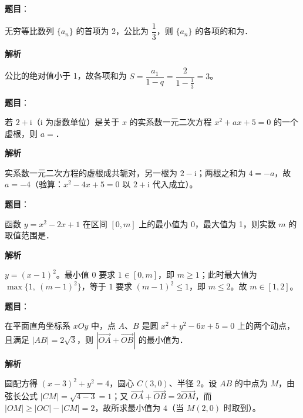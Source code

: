 \begin{answer}

\textbf{题目}：

无穷等比数列 \(\{a_{n}\}\) 的首项为 2，公比为 \(\dfrac{1}{3}\)，则 \(\{a_{n}\}\) 的各项的和为\gkblank{}．

\textbf{解析}

公比的绝对值小于 1，故各项和为 \(S=\dfrac{a_{1}}{1-q}=\dfrac{2}{1-\frac{1}{3}}=3\)。


\end{answer}
\begin{answer}

\textbf{题目}：

若 \(2+\mathrm{i}\)（\(\mathrm{i}\) 为虚数单位）是关于 \(x\) 的实系数一元二次方程 \(x^{2}+ax+5=0\) 的一个虚根，则 \(a=\)\gkblank{}．

\textbf{解析}

实系数一元二次方程的虚根成共轭对，另一根为 \(2-\mathrm{i}\)；两根之和为 \(4=-a\)，故 \(a=-4\)（验算：\(x^{2}-4x+5=0\) 以 \(2+\mathrm{i}\) 代入成立）。


\end{answer}
\begin{answer}

\textbf{题目}：

函数 \(y=x^{2}-2x+1\) 在区间 \([0,m]\) 上的最小值为 0，最大值为 1，则实数 \(m\) 的取值范围是\gkblank{}．

\textbf{解析}

\(y=(x-1)^{2}\)。最小值 \(0\) 要求 \(1\in[0,m]\)，即 \(m\geqslant 1\)；此时最大值为 \(\max\{1,\ (m-1)^{2}\}\)，等于 \(1\) 要求 \((m-1)^{2}\leqslant 1\)，即 \(m\leqslant 2\)。故 \(m\in[1,2]\)。


\end{answer}
\begin{answer}

\textbf{题目}：

在平面直角坐标系 \(xOy\) 中，点 \(A\)、\(B\) 是圆 \(x^{2}+y^{2}-6x+5=0\) 上的两个动点，且满足 \(|AB|=2\sqrt{3}\)，则 \(\left|\overrightarrow{OA}+\overrightarrow{OB}\right|\) 的最小值为\gkblank{}．

\textbf{解析}

圆配方得 \((x-3)^{2}+y^{2}=4\)，圆心 \(C(3,0)\)、半径 \(2\)。设 \(AB\) 的中点为 \(M\)，由弦长公式 \(|CM|=\sqrt{4-3}=1\)；又 \(\overrightarrow{OA}+\overrightarrow{OB}=2\overrightarrow{OM}\)，而 \(|OM|\geqslant|OC|-|CM|=2\)，故所求最小值为 \(4\)（当 \(M(2,0)\) 时取到）。


\end{answer}
